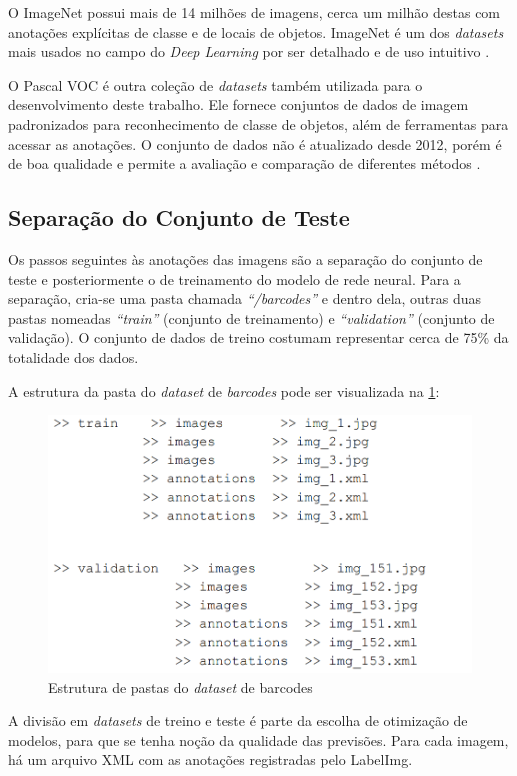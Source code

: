 O ImageNet possui mais de 14 milhões de imagens, cerca um milhão destas com anotações explícitas de classe e de locais de objetos. ImageNet é um dos \textit{datasets} mais usados no campo do \textit{Deep Learning} por ser detalhado e de uso intuitivo \cite{zhou2017application, deng2009imagenet}.

O Pascal VOC é outra coleção de \textit{datasets} também utilizada para o desenvolvimento deste trabalho. Ele fornece conjuntos de dados de imagem padronizados para reconhecimento de classe de objetos, além de ferramentas para acessar as anotações. O conjunto de dados não é atualizado desde 2012, porém é de boa qualidade e permite a avaliação e comparação de diferentes métodos \cite{zhou2017application, everingham2010pascal}.


\subsection{Separação do Conjunto de Teste}

Os passos seguintes às anotações das imagens são a separação do conjunto de teste e posteriormente o de treinamento do modelo de rede neural. Para a separação, cria-se uma pasta chamada \textit{\enquote{/barcodes}} e dentro dela, outras duas pastas nomeadas \textit{\enquote{train}} (conjunto de treinamento) e \textit{\enquote{validation}} (conjunto de validação). O conjunto de dados de treino  costumam representar cerca de 75\% da totalidade dos dados.

A estrutura da pasta do \textit{dataset} de \textit{barcodes} pode ser visualizada na \ref{fig:foldersDataset}:

\begin{figure}[H]
	\centering
	\includegraphics[width=0.5\linewidth]{figuras/MachineLearning/foldersDataset.png}
	\caption{Estrutura de pastas do \textit{dataset} de barcodes}
	\label{fig:foldersDataset}
\end{figure}

A divisão em \textit{datasets} de treino e teste é parte da escolha de otimização de modelos, para que se tenha noção da qualidade das previsões. Para cada imagem, há um arquivo XML com as anotações registradas pelo LabelImg.



